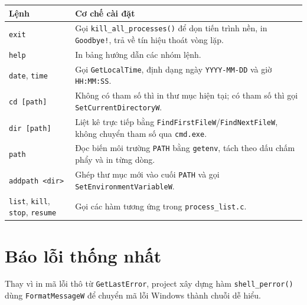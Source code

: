\documentclass[13pt,a4paper,oneside]{extreport}
\begin{document}
\begin{longtable}{|p{3.2cm}|p{11cm}|}
	\hline
	\textbf{Lệnh}                                                & \textbf{Cơ chế cài đặt}                                                                                          \\
	\hline
	\texttt{exit}                                                & Gọi \texttt{kill\_all\_processes()} để dọn tiến trình nền, in \texttt{Goodbye!}, trả về tín hiệu thoát vòng lặp. \\
	\hline
	\texttt{help}                                                & In bảng hướng dẫn các nhóm lệnh.                                                                                 \\
	\hline
	\texttt{date}, \texttt{time}                                 & Gọi \texttt{GetLocalTime}, định dạng ngày \texttt{YYYY-MM-DD} và giờ \texttt{HH:MM:SS}.                          \\
	\hline
	\texttt{cd [path]}                                           & Không có tham số thì in thư mục hiện tại; có tham số thì gọi \texttt{SetCurrentDirectoryW}.                      \\
	\hline
	\texttt{dir [path]}                                          & Liệt kê trực tiếp bằng \texttt{FindFirstFileW}/\texttt{FindNextFileW}, không chuyển tham số qua \texttt{cmd.exe}. \\
	\hline
	\texttt{path}                                                & Đọc biến môi trường \texttt{PATH} bằng \texttt{getenv}, tách theo dấu chấm phẩy và in từng dòng.                 \\
	\hline
	\texttt{addpath <dir>}                                       & Ghép thư mục mới vào cuối \texttt{PATH} và gọi \texttt{SetEnvironmentVariableW}.                                 \\
	\hline
	\texttt{list}, \texttt{kill}, \texttt{stop}, \texttt{resume} & Gọi các hàm tương ứng trong \texttt{process\_list.c}.                                                            \\
	\hline
\end{longtable}

\section{Báo lỗi thống nhất}

Thay vì in mã lỗi thô từ \texttt{GetLastError}, project xây dựng hàm \texttt{shell\_perror()} dùng \texttt{FormatMessageW} để chuyển mã lỗi Windows thành chuỗi dễ hiểu.
\end{document}
